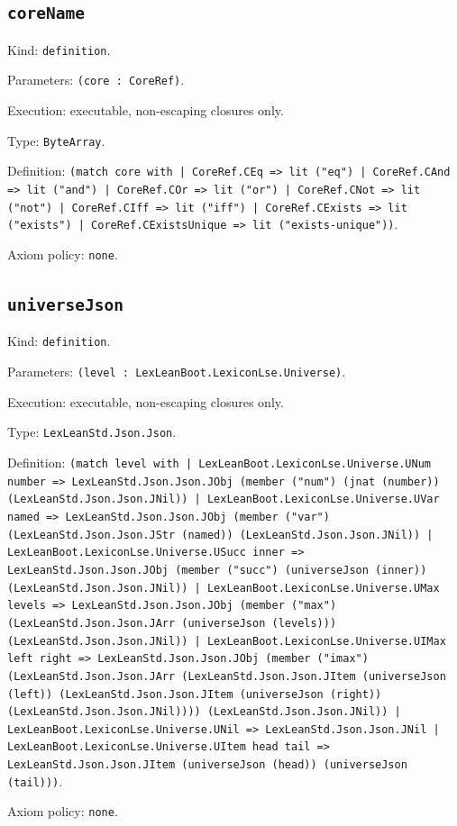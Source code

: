 \documentclass[11pt]{article}
\begin{document}
\subsection*{\texttt{coreName}}
\noindent Kind: \texttt{definition}.\par
\noindent Parameters: \texttt{(core : CoreRef)}.\par
\noindent Execution: executable, non-escaping closures only.\par
\noindent Type: \texttt{ByteArray}.\par
\noindent Definition: \texttt{(match core with | CoreRef.CEq => lit ("eq") | CoreRef.CAnd => lit ("and") | CoreRef.COr => lit ("or") | CoreRef.CNot => lit ("not") | CoreRef.CIff => lit ("iff") | CoreRef.CExists => lit ("exists") | CoreRef.CExistsUnique => lit ("exists-unique"))}.\par
\noindent Axiom policy: \texttt{none}.\par
\subsection*{\texttt{universeJson}}
\noindent Kind: \texttt{definition}.\par
\noindent Parameters: \texttt{(level : LexLeanBoot.LexiconLse.Universe)}.\par
\noindent Execution: executable, non-escaping closures only.\par
\noindent Type: \texttt{LexLeanStd.Json.Json}.\par
\noindent Definition: \texttt{(match level with | LexLeanBoot.LexiconLse.Universe.UNum number => LexLeanStd.Json.Json.JObj (member ("num") (jnat (number)) (LexLeanStd.Json.Json.JNil)) | LexLeanBoot.LexiconLse.Universe.UVar named => LexLeanStd.Json.Json.JObj (member ("var") (LexLeanStd.Json.Json.JStr (named)) (LexLeanStd.Json.Json.JNil)) | LexLeanBoot.LexiconLse.Universe.USucc inner => LexLeanStd.Json.Json.JObj (member ("succ") (universeJson (inner)) (LexLeanStd.Json.Json.JNil)) | LexLeanBoot.LexiconLse.Universe.UMax levels => LexLeanStd.Json.Json.JObj (member ("max") (LexLeanStd.Json.Json.JArr (universeJson (levels))) (LexLeanStd.Json.Json.JNil)) | LexLeanBoot.LexiconLse.Universe.UIMax left right => LexLeanStd.Json.Json.JObj (member ("imax") (LexLeanStd.Json.Json.JArr (LexLeanStd.Json.Json.JItem (universeJson (left)) (LexLeanStd.Json.Json.JItem (universeJson (right)) (LexLeanStd.Json.Json.JNil)))) (LexLeanStd.Json.Json.JNil)) | LexLeanBoot.LexiconLse.Universe.UNil => LexLeanStd.Json.Json.JNil | LexLeanBoot.LexiconLse.Universe.UItem head tail => LexLeanStd.Json.Json.JItem (universeJson (head)) (universeJson (tail)))}.\par
\noindent Axiom policy: \texttt{none}.\par
\end{document}
